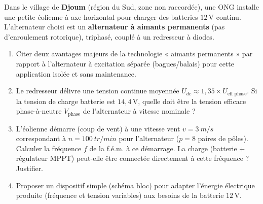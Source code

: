 \documentclass[11pt]{article}
\begin{document}
\begin{exercice}
Dans le village de \textbf{Djoum} (région du Sud, zone non raccordée), une ONG installe une petite éolienne à axe horizontal pour charger des batteries $12\,\text{V}$ continu. L'alternateur choisi est un \textbf{alternateur à aimants permanents} (pas d'enroulement rotorique), triphasé, couplé à un redresseur à diodes.

\begin{enumerate}
    \item Citer deux avantages majeurs de la technologie « aimants permanents » par rapport à l'alternateur à excitation séparée (bagues/balais) pour cette application isolée et sans maintenance.
    \item Le redresseur délivre une tension continue moyennée $U_{dc} \approx 1,35 \times U_{\text{eff phase}}$. Si la tension de charge batterie est $14,4\,\text{V}$, quelle doit être la tension efficace phase-à-neutre $V_{\text{phase}}$ de l'alternateur à vitesse nominale ?
    \item L'éolienne démarre (coup de vent) à une vitesse vent $v = \SI{3}{m/s}$ correspondant à $n = \SI{100}{tr/min}$ pour l'alternateur ($p=8$ paires de pôles). Calculer la fréquence $f$ de la f.é.m. à ce démarrage. La charge (batterie + régulateur MPPT) peut-elle être connectée directement à cette fréquence ? Justifier.
    \item Proposer un dispositif simple (schéma bloc) pour adapter l'énergie électrique produite (fréquence et tension variables) aux besoins de la batterie $12\,\text{V}$.
\end{enumerate}
\end{exercice}
\end{document}
